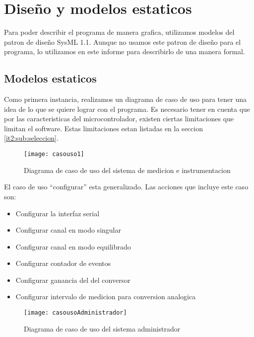 \section{Diseño y modelos estaticos} %
\label{it2:sec:diseno_y_modelos_estaticos}

Para poder describir el programa de manera grafica, utilizamos modelos del patron de diseño SysML 1.1. Aunque no usamos este patron de diseño para el programa, lo utilizamos en este informe para describirlo de una manera formal.

\subsection{Modelos estaticos} %
\label{it2:sub:modelos_estaticos}

Como primera instancia, realizamos un diagrama de caso de uso para tener una idea de lo que se quiere lograr con el programa. Es necesario tener en cuenta que por las caracteristicas del microcontrolador, existen ciertas limitaciones que limitan el software. Estas limitaciones estan listadas en la seccion \ref{it2:sub:seleccion}.

\begin{figure}[h]
  \centering
  \texttt{[image: casouso1]}
  \caption{Diagrama de caso de uso del sistema de medicion e instrumentacion}\label{fig:casouso1}
\end{figure}

El caso de uso ``configurar'' esta generalizado. Las acciones que incluye este caso son:
\begin{itemize}
  \item Configurar la interfaz serial
  \item Configurar canal en modo singular
  \item Configurar canal en modo equilibrado
  \item Configurar contador de eventos
  \item Configurar ganancia del del conversor
  \item Configurar intervalo de medicion para conversion analogica
\end{itemize}

\begin{figure}[h]
  \centering
  \texttt{[image: casousoAdministrador]}
  \caption{Diagrama de caso de uso del sistema administrador}\label{fig:casousoAdministrador}
\end{figure}

